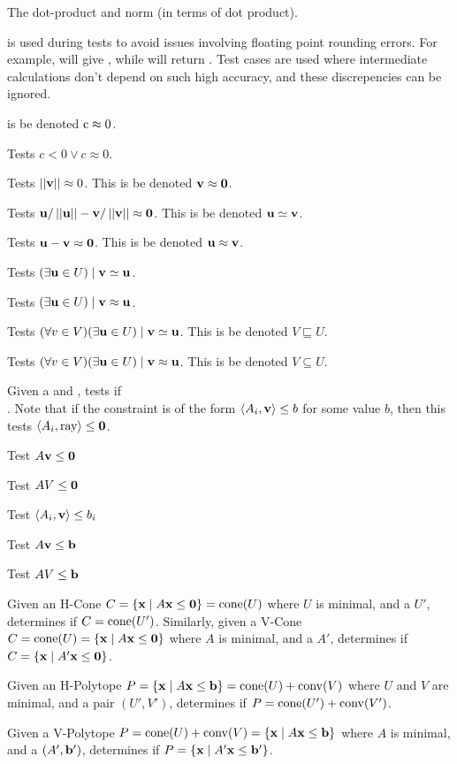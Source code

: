 The dot-product and norm (in terms of dot product).
\lstoperator
\lstnorm

 is used during tests to avoid issues involving floating point rounding errors.  For example,  will give , while  will return .  Test cases are used where intermediate calculations don't depend on such high accuracy, and these discrepencies can be ignored.

 is be denoted $\mli{c} \approx 0$.
\lstapproximatelyzeroa

Tests $c < 0 \lor c \approx 0$.
\lstapproximatelyltzero

Tests $\left|\left|\mathbf{v}\right|\right| \approx 0$.  This is be denoted $\mathbf{v} \approx \mathbf{0}$.
\lstapproximatelyzerob

Tests $\mathbf{u}/\left|\left|\mathbf{u}\right|\right| - \mathbf{v}/\left|\left|\mathbf{v}\right|\right| \approx \mathbf{0} $.  This is be denoted $\mathbf{u} \simeq \mathbf{v}$.
\lstisequivalent

Tests $\mathbf{u} - \mathbf{v} \approx \mathbf{0}$.  This is be denoted $\mathbf{u} \approx \mathbf{v}$.
\lstisequal

Tests $(\exists \mathbf{u} \in U) \;|\; \mathbf{v} \simeq \mathbf{u}$.
\lsthasequivalentmember

Tests $(\exists \mathbf{u} \in U) \;|\; \mathbf{v} \approx \mathbf{u}$.
\lsthasequalmember

Tests $(\forall v \in V)(\exists \mathbf{u} \in U) \;|\; \mathbf{v} \simeq \mathbf{u}$.  This is be denoted $V \sqsubseteq U$.
\lstsubsetmodeq

Tests $(\forall v \in V)(\exists \mathbf{u} \in U) \;|\; \mathbf{v} \approx \mathbf{u}$.  This is be denoted $V \subseteq U$.
\lstsubset

Given a  and , tests if \\
.  Note that if the constraint is of the form $\left\langle A_i, \mathbf{v} \right\rangle \leq b$ for some value $b$, then this tests $\ip{A_i}{\mli{ray}}\leq\0$.
\lstraysatisfieda

Test $A\mathbf{v} \leq \mathbf{0}$
\lstraysatisfiedb

Test $AV \leq \mathbf{0}$
\lstrayssatisfied

Test $\left\langle A_i, \mathbf{v} \right\rangle \leq b_i$
\lstvecsatisfieda

Test $A\mathbf{v} \leq \mathbf{b}$
\lstvecsatisfiedb

Test $AV \leq \mathbf{b}$
\lstvecssatisfied

Given an H-Cone $C = \left\{\mathbf{x}\;|\; A\mathbf{x}\leq\mathbf{0}\right\} = \operatorname{cone}(U)$ where $U$ is minimal, and a  $U'$, determines if $C = \operatorname{cone}(U')$.
Similarly, given a V-Cone $C = \operatorname{cone}(U) = \left\{\mathbf{x}\;|\; A\mathbf{x}\leq\mathbf{0}\right\}$ where $A$ is minimal, and a  $A'$, determines if $C = \left\{\mathbf{x}\;|\; A'\mathbf{x}\leq\mathbf{0}\right\}$.
\lstequivalentconerep

Given an H-Polytope $P = \left\{\mathbf{x}\;|\; A\mathbf{x}\leq \mathbf{b}\right\} = \operatorname{cone}(U) + \operatorname{conv}(V)$ where $U$ and $V$ are minimal, and a pair $(U',V')$, determines if $P = \operatorname{cone}(U') + \operatorname{conv}(V')$.
\lstequivalenthpolyrep

Given a V-Polytope $P = \operatorname{cone}(U) + \operatorname{conv}(V) = \left\{\mathbf{x}\;|\; A\mathbf{x}\leq \mathbf{b}\right\}$ where $A$ is minimal, and a  $(A',\mathbf{b}')$, determines if $P = \left\{\mathbf{x}\;|\; A'\mathbf{x}\leq \mathbf{b}'\right\}$.
\lstequivalentvpolyrep



